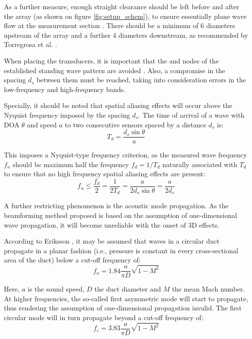 As a further measure, enough straight clearance should be left before and after the array (as shown on figure \ref{fig:setup_schem}), to ensure essentially plane wave flow at the measurement section \cite{holland2000measurement}. There should be a minimum of 6 diameters upstream of the array and a further 4 diameters downstream, as recommended by Torregrosa et al. \cite{torregrosa2005exp}.

When placing the transducers, it is important that the  and  nodes of the established standing wave pattern are avoided \cite{dowling1983sound}. Also, a compromise in the spacing $d_s$ between them must be reached, taking into consideration errors in the  low-frequency \cite{aabom1988error} and high-frequency \cite{seybert1988two} bands.

Specially, it should be noted that spatial aliasing effects will occur above the Nyquist frequency imposed by the spacing $d_s$. The time of arrival of a wave with DOA $\theta$ and speed $a$ to two consecutive sensors spaced by a distance $d_s$ is:
\begin{equation}
  T_d = \frac{d_s \sin \theta}{a}
\end{equation}

This imposes a Nyquist-type frequency criterion, as the measured wave frequency $f_n$ should be maximum half the frequency $f_d=1/T_d$ naturally associated with $T_d$ to ensure that no high frequency spatial aliasing effects are present:
\begin{equation}\label{eq:f_nyquist}
  f_n \leq \frac{f_d}{2} = \frac{1}{2T_d}=\frac{a}{2d_s \sin \theta}=\frac{a}{2d_s}
\end{equation}

A further restricting phenomenon is the acoustic mode propagation. As the beamforming method proposed is based on the assumption of one-dimensional wave propagation, it will become unreliable with the onset of 3D effects.

According to Eriksson \cite{eriksson1980higher}, it may be assumed that waves in a circular duct propagate in a planar fashion (i.e., pressure is constant in every cross-sectional area of the duct) below a cut-off frequency of:
\begin{equation}\label{eq:f_modes}
f_a = 1.84 \frac{a}{\pi D}\sqrt{1-M^2}
\end{equation}

Here, $a$ is the sound speed, $D$ the duct diameter and $M$ the mean Mach number. At higher frequencies, the so-called first asymmetric mode will start to propagate, thus rendering the assumption of one-dimensional propagation invalid. The first circular mode will in turn propagate beyond a cut-off frequency of:
\begin{equation}\label{eq:f_modes_circ}
f_c = 3.83 \frac{a}{\pi D}\sqrt{1-M^2}
\end{equation}

